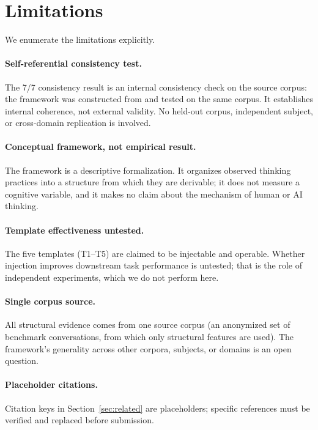 \section{Limitations}
\label{sec:limitations}

We enumerate the limitations explicitly.

\paragraph{Self-referential consistency test.}
The 7/7 consistency result is an internal consistency check on the source
corpus: the framework was constructed from and tested on the same corpus. It
establishes internal coherence, not external validity. No held-out corpus,
independent subject, or cross-domain replication is involved.

\paragraph{Conceptual framework, not empirical result.}
The framework is a descriptive formalization. It organizes observed thinking
practices into a structure from which they are derivable; it does not measure a
cognitive variable, and it makes no claim about the mechanism of human or AI
thinking.

\paragraph{Template effectiveness untested.}
The five templates (T1--T5) are claimed to be injectable and operable. Whether
injection improves downstream task performance is untested; that is the role of
independent experiments, which we do not perform here.

\paragraph{Single corpus source.}
All structural evidence comes from one source corpus (an anonymized set of
benchmark conversations, from which only structural features are used). The
framework's generality across other corpora, subjects, or domains is an open
question.

\paragraph{Placeholder citations.}
Citation keys in Section~\ref{sec:related} are placeholders; specific references
must be verified and replaced before submission.

